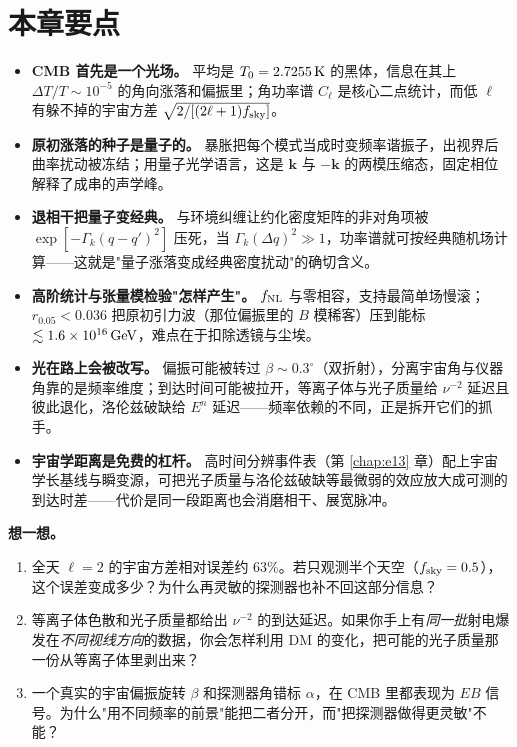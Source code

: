 \section*{本章要点}

\begin{itemize}
\item \textbf{CMB 首先是一个光场。} 平均是 \(T_0=2.7255\,{\rm K}\) 的黑体，信息在其上 \(\Delta T/T\sim10^{-5}\) 的角向涨落和偏振里；角功率谱 \(C_\ell\) 是核心二点统计，而低 \(\ell\) 有躲不掉的宇宙方差 \(\sqrt{2/[(2\ell+1)f_{\rm sky}]}\)。
\item \textbf{原初涨落的种子是量子的。} 暴胀把每个模式当成时变频率谐振子，出视界后曲率扰动被冻结；用量子光学语言，这是 \(\bm k\) 与 \(-\bm k\) 的两模压缩态，固定相位解释了成串的声学峰。
\item \textbf{退相干把量子变经典。} 与环境纠缠让约化密度矩阵的非对角项被 \(\exp[-\Gamma_k(q-q')^2]\) 压死，当 \(\Gamma_k(\Delta q)^2\gg1\)，功率谱就可按经典随机场计算——这就是"量子涨落变成经典密度扰动"的确切含义。
\item \textbf{高阶统计与张量模检验"怎样产生"。} \(f_{\rm NL}\) 与零相容，支持最简单场慢滚；\(r_{0.05}<0.036\) 把原初引力波（那位偏振里的 \(B\) 模稀客）压到能标 \(\lesssim1.6\times10^{16}\,{\rm GeV}\)，难点在于扣除透镜与尘埃。
\item \textbf{光在路上会被改写。} 偏振可能被转过 \(\beta\sim0.3^\circ\)（双折射），分离宇宙角与仪器角靠的是频率维度；到达时间可能被拉开，等离子体与光子质量给 \(\nu^{-2}\) 延迟且彼此退化，洛伦兹破缺给 \(E^{n}\) 延迟——频率依赖的不同，正是拆开它们的抓手。
\item \textbf{宇宙学距离是免费的杠杆。} 高时间分辨事件表（第 \ref{chap:e13} 章）配上宇宙学长基线与瞬变源，可把光子质量与洛伦兹破缺等最微弱的效应放大成可测的到达时差——代价是同一段距离也会消磨相干、展宽脉冲。
\end{itemize}

\medskip
\noindent\textbf{想一想。}
\begin{enumerate}
\item 全天 \(\ell=2\) 的宇宙方差相对误差约 \(63\%\)。若只观测半个天空（\(f_{\rm sky}=0.5\)），这个误差变成多少？为什么再灵敏的探测器也补不回这部分信息？
\item 等离子体色散和光子质量都给出 \(\nu^{-2}\) 的到达延迟。如果你手上有\emph{同一批}射电爆发在\emph{不同视线方向}的数据，你会怎样利用 DM 的变化，把可能的光子质量那一份从等离子体里剥出来？
\item 一个真实的宇宙偏振旋转 \(\beta\) 和探测器角错标 \(\alpha\)，在 CMB 里都表现为 \(EB\) 信号。为什么"用不同频率的前景"能把二者分开，而"把探测器做得更灵敏"不能？
\end{enumerate}
